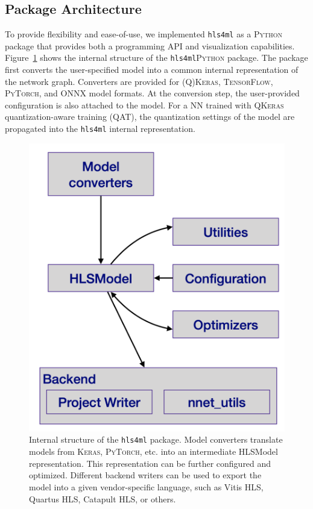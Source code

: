 \documentclass[tinyml]{acmart}
\newcommand{\hlsfml}{\texttt{hls4ml}\xspace}
\begin{document}

\subsection*{Package Architecture}
To provide flexibility and ease-of-use, we implemented \hlsfml as a \textsc{Python} package that provides both a programming API and visualization capabilities.
%
Figure~\ref{fig:arch} shows the internal structure of the \hlsfml \textsc{Python} package.
The package first converts the user-specified model into a common internal representation of the network graph.
Converters are provided for \textsc{(Q)Keras}, \textsc{TensorFlow}, \textsc{PyTorch}, and \textsc{ONNX} model formats.
At the conversion step, the user-provided configuration is also attached to the model.
For a NN trained with \textsc{QKeras} quantization-aware training (QAT), the quantization settings of the model are propagated into the \hlsfml internal representation.

\begin{figure}[t!]
\centering
\includegraphics[width=0.5\columnwidth]{Figs/hls4ml-arch.png}
\caption{Internal structure of the \hlsfml package.
Model converters translate models from \textsc{Keras}, \textsc{PyTorch}, etc. into an intermediate HLSModel representation.
This representation can be further configured and optimized.
Different backend writers can be used to export the model into a given vendor-specific language, such as Vitis HLS, Quartus HLS, Catapult HLS, or others.}
\label{fig:arch}
\end{figure}
\end{document}
